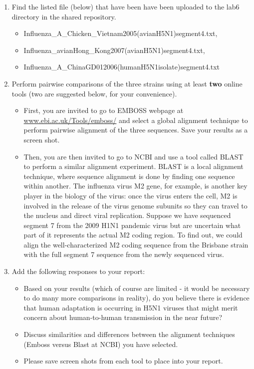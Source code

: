 \begin{enumerate}
	\item Find the listed file (below) that have been have been uploaded to the lab6 directory in the shared repository. 
	
	
		\begin{itemize}
		\item Influenza\_A\_Chicken\_Vietnam2005(avianH5N1)segment4.txt,
		\item Influenza\_avianHong\_Kong2007(avianH5N1)segment4.txt,
		\item Influenza\_A\_ChinaGD012006(humanH5N1isolate)segment4.txt
	\end{itemize}

	\item Perform pairwise comparisons of the three strains using at least \textbf{two} online tools (two are suggested below, for your convenience). 
	\begin{itemize}
		\item  First, you are invited to go to EMBOSS webpage at \url{www.ebi.ac.uk/Tools/emboss/} and select a global alignment technique to perform pairwise alignment of the three sequences. Save your results as a screen shot.

		\item Then, you are then invited to go to NCBI and use a tool called BLAST to perform a similar alignment experiment. BLAST is a local alignment technique, where sequence alignment is done by finding one sequence within another.  The influenza virus M2 gene, for example, is another key player in the biology of the virus: once the virus enters the cell, M2 is involved in the release of the virus genome subunits so they can travel to the nucleus and direct viral replication.  Suppose we have sequenced segment 7 from the 2009 H1N1 pandemic virus but are uncertain what part of it represents the actual M2 coding region. To find out, we could align the well-characterized M2 coding sequence from the Brisbane strain with the full segment 7 sequence from the newly sequenced virus.
	\end{itemize}
	\item Add the following responses to your report:
	\begin{itemize}
	
		\item Based on your results (which of course are limited - it would be necessary to do many more comparisons in reality), do you believe there is evidence that human adaptation is occurring in H5N1 viruses that might merit concern about human-to-human transmission in the near future?
		\item Discuss similarities and differences between the alignment techniques (Emboss versus Blast at NCBI) you have selected.
		\item Please save screen shots from each tool to place into your report. 
	\end{itemize}
		 
\end{enumerate}


